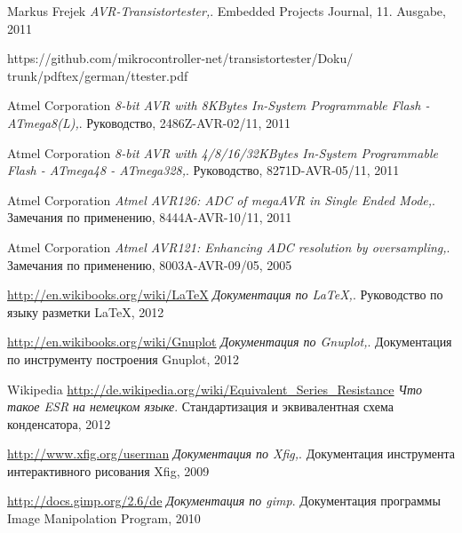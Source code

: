 \documentclass[12pt,a4paper,oneside,english]{report}
\begin{document}








 
 
 
 
 
 






\begin{thebibliography}{99}

Markus Frejek
\emph{AVR-Transistortester,}.
Embedded Projects Journal,
11. Ausgabe,
2011

https://github.com/mikrocontroller-net/transistortester/Doku/
trunk/pdftex/german/ttester.pdf

Atmel Corporation
\emph{8-bit AVR with 8KBytes In-System Programmable Flash - ATmega8(L),}.
Руководство,
2486Z-AVR-02/11,
2011

Atmel Corporation
\emph{8-bit AVR with 4/8/16/32KBytes In-System Programmable Flash - ATmega48 - ATmega328,}.
Руководство,
8271D-AVR-05/11,
2011

Atmel Corporation
\emph{Atmel AVR126: ADC of megaAVR in Single Ended Mode,}.
Замечания по применению,
8444A-AVR-10/11,
2011

Atmel Corporation
\emph{Atmel AVR121: Enhancing ADC resolution by oversampling,}.
Замечания по применению,
8003A-AVR-09/05,
2005

\url{http://en.wikibooks.org/wiki/LaTeX}
\emph{Документация по LaTeX,}.
Руководство по языку разметки LaTeX,
2012

\url{http://en.wikibooks.org/wiki/Gnuplot}
\emph{Документация по Gnuplot,}.
Документация по инструменту построения Gnuplot,
2012

Wikipedia
\url{http://de.wikipedia.org/wiki/Equivalent_Series_Resistance}
\emph{Что такое ESR на немецком языке}.
Стандартизация и эквивалентная схема конденсатора,
2012


\url{http://www.xfig.org/userman}
\emph{Документация по Xfig,}.
Документация инструмента интерактивного рисования Xfig,
2009

\url{http://docs.gimp.org/2.6/de}
\emph{Документация по gimp}.
Документация программы Image Manipolation Program,
2010


\end{thebibliography}
\end{document}
